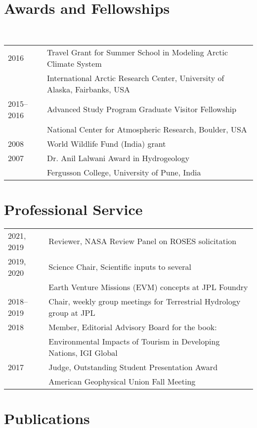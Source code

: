\documentclass[10pt]{article}
\begin{document}
\section*{Awards and Fellowships}
\hline
\label{awards-and-fellowships}\\
\begin{tabular}{ l l }
2016 & Travel Grant for Summer School in Modeling Arctic Climate System \\
{} & International Arctic Research Center, University of Alaska, Fairbanks, USA \\
2015--2016 & Advanced Study Program Graduate Visitor Fellowship \\
{} & National Center for Atmospheric Research, Boulder, USA \\
2008 & World Wildlife Fund (India) grant \\
2007 &Dr. Anil Lalwani Award in Hydrogeology \\
{} & Fergusson College, University of Pune, India \\
\end{tabular}

\section*{Professional Service}
\hline
\label{professional-service}
\begin{tabular}{ l l }
2021, 2019& Reviewer, NASA Review Panel on ROSES solicitation \\
2019, 2020& Science Chair, Scientific inputs to several \\
{} & Earth Venture Missions (EVM) concepts at JPL Foundry \\
2018--2019 & Chair, weekly group meetings for Terrestrial Hydrology group at JPL \\
2018 & Member, Editorial Advisory Board for the book:\\ 
{} & Environmental Impacts of Tourism in Developing Nations, IGI Global \\
2017 & Judge, Outstanding Student Presentation Award \\
{} & American Geophysical Union Fall Meeting \\
\end{tabular}

\FloatBarrier
\section*{Publications}\sloppy
\hline
\end{document}
